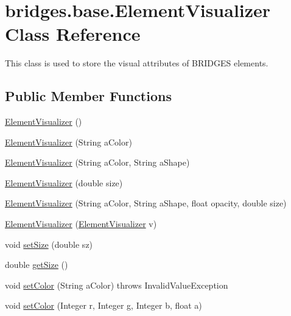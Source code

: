 \hypertarget{classbridges_1_1base_1_1_element_visualizer}{}\section{bridges.\+base.\+Element\+Visualizer Class Reference}
\label{classbridges_1_1base_1_1_element_visualizer}


This class is used to store the visual attributes of B\+R\+I\+D\+G\+E\+S elements.  


\subsection*{Public Member Functions}
\begin{DoxyCompactItemize}
\item 
\hyperlink{classbridges_1_1base_1_1_element_visualizer_acbca874876ec1e8dbbde6484a4fc056e}{Element\+Visualizer} ()
\item 
\hyperlink{classbridges_1_1base_1_1_element_visualizer_a5c0d9fe8051ebc816372b9836689fdfa}{Element\+Visualizer} (String a\+Color)
\item 
\hyperlink{classbridges_1_1base_1_1_element_visualizer_ab62b1b06907fbeddfcee2b4b297e1021}{Element\+Visualizer} (String a\+Color, String a\+Shape)
\item 
\hyperlink{classbridges_1_1base_1_1_element_visualizer_ab32f66b72ccf0a26c03ba44006da9ac6}{Element\+Visualizer} (double size)
\item 
\hyperlink{classbridges_1_1base_1_1_element_visualizer_a9bf06ca1b6c215e079ab33ccd99633e8}{Element\+Visualizer} (String a\+Color, String a\+Shape, float opacity, double size)
\item 
\hyperlink{classbridges_1_1base_1_1_element_visualizer_a5b48cbda94a4e84e40de41fe156e2497}{Element\+Visualizer} (\hyperlink{classbridges_1_1base_1_1_element_visualizer}{Element\+Visualizer} v)
\item 
void \hyperlink{classbridges_1_1base_1_1_element_visualizer_aba410184f7df495594fc1fa7948335a5}{set\+Size} (double sz)
\item 
double \hyperlink{classbridges_1_1base_1_1_element_visualizer_a0b7673bf724e3df1f94df50ad95ca5b1}{get\+Size} ()
\item 
void \hyperlink{classbridges_1_1base_1_1_element_visualizer_ae24d6c51ba22481c3dbfc0dd512c0a32}{set\+Color} (String a\+Color)  throws Invalid\+Value\+Exception
\item 
void \hyperlink{classbridges_1_1base_1_1_element_visualizer_a84fad1c8abe43b20c68c1800d7630918}{set\+Color} (Integer r, Integer g, Integer b, float a)

\end{DoxyCompactItemize}
